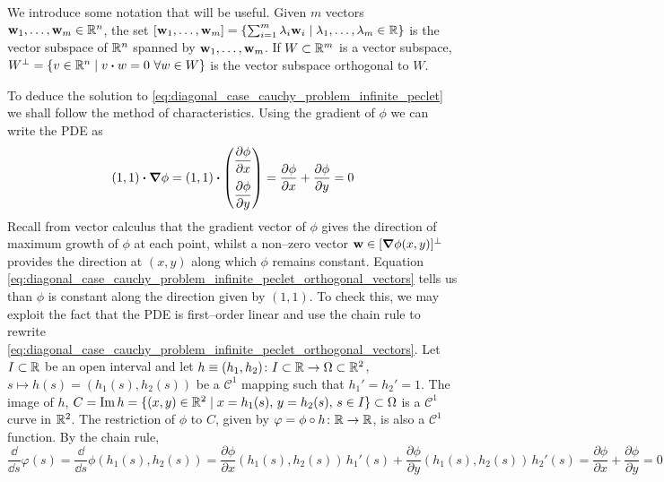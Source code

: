 We introduce some notation that will be useful. Given $m$ vectors $\vb{w}_1, \ldots, \vb{w}_m \in \mathbb{R}^n$, the set $[\vb{w}_1, \ldots, \vb{w}_m] = \{ \sum_{i=1}^m \lambda_i \vb{w}_i \mid \lambda_1, \ldots, \lambda_m \in \mathbb{R} \}$ is the vector subspace of $\mathbb{R}^n$ spanned by $\vb{w}_1, \ldots, \vb{w}_m$. If $W \subset \mathbb{R}^m$ is a vector subspace, $W^\perp = \{ v \in \real^n \mid v \vdot w = 0 \ \forall w \in W \}$ is the vector subspace orthogonal to $W$.

To deduce the solution to \eqref{eq:diagonal_case_cauchy_problem_infinite_peclet} we shall follow the method of characteristics. Using the gradient of $\phi$ we can write the PDE as
\begin{equation} \label{eq:diagonal_case_cauchy_problem_infinite_peclet_orthogonal_vectors}
	\left( 1, 1 \right)
	\vdot
	\grad{\phi} = 
	\left( 1, 1 \right)
	\vdot
	\begin{pmatrix}
	\displaystyle\pdv{\phi}{x} \\[10pt] \displaystyle\pdv{\phi}{y}
	\end{pmatrix} = 
	\pdv{\phi}{x} + \pdv{\phi}{y} = 0
\end{equation}
Recall from vector calculus that the gradient vector of $\phi$ gives the direction of maximum growth of $\phi$ at each point, whilst a non--zero vector $\vb{w} \in [\grad{\phi}(x,y)]^\perp$ provides the direction at $(x,y)$ along which $\phi$ remains constant. Equation \eqref{eq:diagonal_case_cauchy_problem_infinite_peclet_orthogonal_vectors} tells us than $\phi$ is constant along the direction given by $(1, 1)$. To check this, we may exploit the fact that the PDE is first--order linear and use the chain rule to rewrite \eqref{eq:diagonal_case_cauchy_problem_infinite_peclet_orthogonal_vectors}. Let $I \subset \mathbb{R}$ be an open interval and let $h \equiv (h_1, h_2) \colon I \subset \mathbb{R} \rightarrow \Omega \subset \mathbb{R}^2$, $s \mapsto h(s) = (h_1(s), h_2(s))$ be a $\mathcal{C}^1$ mapping such that $h_1' = h_2' = 1$. The image of $h$, $C = \operatorname{Im}{h} = \{ (x, y) \in \mathbb{R}^2 \mid x = h_1(s), \, y = h_2(s), \, s \in I \} \subset \Omega$ is a $\mathcal{C}^1$ curve in $\mathbb{R}^2$. The restriction of $\phi$ to  $C$, given by $\varphi = \phi \circ h \colon \mathbb{R} \rightarrow \mathbb{R}$, is also a $\mathcal{C}^1$ function. By the chain rule,
\begin{equation} \label{eq:diagonal_case_cauchy_problem_infinite_peclet_chain_rule}
	\frac{\dd}{\dd{s}} \varphi(s) = 
	\frac{\dd}{\dd{s}} \phi(h_1(s), h_2(s)) = 
	\frac{\partial \phi}{\partial x} (h_1(s), h_2(s)) \, h_1'(s) + 
	\frac{\partial \phi}{\partial y} (h_1(s), h_2(s)) \, h_2'(s) =
	\frac{\partial \phi}{\partial x} + \frac{\partial \phi}{\partial y} = 0
\end{equation}
